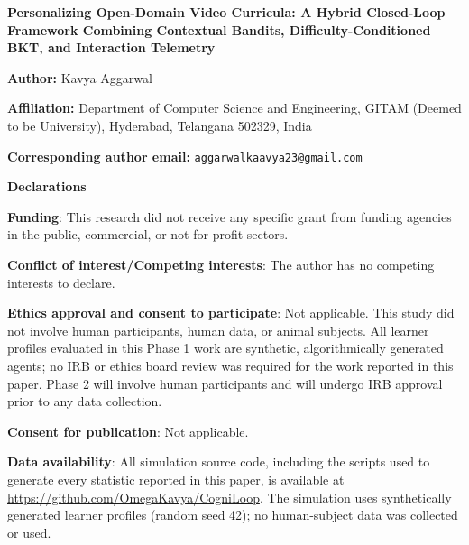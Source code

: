 \documentclass[11pt]{article}
\begin{document}
\thispagestyle{empty}

\begin{center}
{\LARGE\bfseries Personalizing Open-Domain Video Curricula: A Hybrid Closed-Loop Framework Combining Contextual Bandits, Difficulty-Conditioned BKT, and Interaction Telemetry}
\end{center}

\vspace{1.5em}
\noindent
\textbf{Author:} Kavya Aggarwal

\vspace{0.5em}
\noindent
\textbf{Affiliation:} Department of Computer Science and Engineering, GITAM (Deemed to be University), Hyderabad, Telangana 502329, India

\vspace{0.5em}
\noindent
\textbf{Corresponding author email:} \texttt{aggarwalkaavya23@gmail.com}

\vspace{2em}
\noindent
\textbf{Declarations}

\vspace{0.5em}
\noindent
\textbf{Funding}: This research did not receive any specific grant from funding agencies in the public, commercial, or not-for-profit sectors.

\vspace{0.5em}
\noindent
\textbf{Conflict of interest/Competing interests}: The author has no competing interests to declare.

\vspace{0.5em}
\noindent
\textbf{Ethics approval and consent to participate}: Not applicable. This study did not involve human participants, human data, or animal subjects. All learner profiles evaluated in this Phase 1 work are synthetic, algorithmically generated agents; no IRB or ethics board review was required for the work reported in this paper. Phase 2 will involve human participants and will undergo IRB approval prior to any data collection.

\vspace{0.5em}
\noindent
\textbf{Consent for publication}: Not applicable.

\vspace{0.5em}
\noindent
\textbf{Data availability}: All simulation source code, including the scripts used to generate every statistic reported in this paper, is available at \url{https://github.com/OmegaKavya/CogniLoop}. The simulation uses synthetically generated learner profiles (random seed 42); no human-subject data was collected or used.
\end{document}
